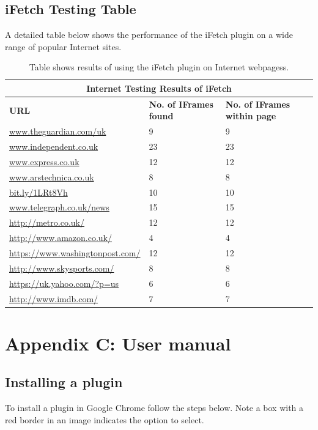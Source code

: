 \documentclass[12pt]{article}
\begin{document}
\subsection{iFetch Testing Table} \label{iFetchTesting}
A detailed table below shows the performance of the iFetch plugin on a wide range of popular Internet sites. 

{
\begin{table} [H]
\centering
\begin{tabular}{ |p{5cm}|p{5cm}|p{5cm}|  }
\hline
\multicolumn{3}{|c|}{\textbf{Internet Testing Results of iFetch}} \\
\hline
\textbf{URL} & \textbf{No. of IFrames found} & \textbf{No. of IFrames within page} \\
\hline
\url{www.theguardian.com/uk} & 9 & 9  \\
\hline
\url{www.independent.co.uk} & 23 & 23  \\
\hline
\url{www.express.co.uk} & 12 & 12 \\
\hline
\url{www.arstechnica.co.uk} & 8 & 8  \\
\hline
\url{bit.ly/1LRt8Vh} & 10 & 10 \\
\hline
\url{www.telegraph.co.uk/news} & 15 & 15 \\
\hline
\url{http://metro.co.uk/} & 12 & 12 \\
\hline
\url{http://www.amazon.co.uk/} & 4 & 4  \\
\hline
\url{https://www.washingtonpost.com/} & 12 & 12 \\
\hline
\url{http://www.skysports.com/} & 8 & 8\\
\hline
\url{https://uk.yahoo.com/?p=us} & 6 & 6 \\
\hline
\url{http://www.imdb.com/} & 7 & 7 \\
\hline
\end{tabular}
\caption{Table shows results of using the iFetch plugin on Internet webpagess.}
\label{table:5}
\end{table}
}

\section{Appendix C: User manual} \label{userman}

\subsection{Installing a plugin} \label{installPlugin}
To install a plugin in Google Chrome follow the steps below. Note a box with a red border in an image indicates the option to select. 
\end{document}
